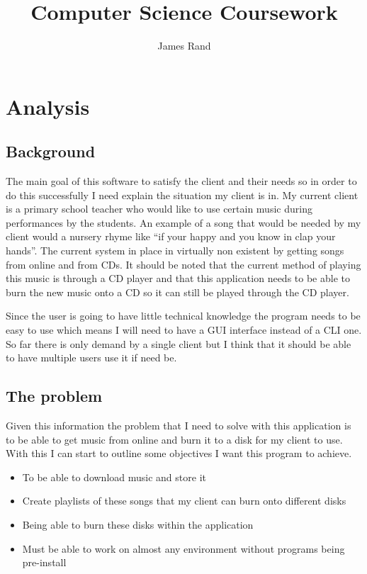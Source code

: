 \documentclass{article}
\title{Computer Science Coursework}
\date{}
\author{James Rand}
\def\tightlist{}
\begin{document}
\maketitle

\tableofcontents
\setcounter{tocdepth}{5}

\newpage

\section{Analysis}\label{analysis}

\subsection{Background}\label{background}

The main goal of this software to satisfy the client and their needs so
in order to do this successfully I need explain the situation my client
is in. My current client is a primary school teacher who would like to
use certain music during performances by the students. An example of a
song that would be needed by my client would a nursery rhyme like ``if
your happy and you know in clap your hands''. The current system in
place in virtually non existent by getting songs from online
and from CDs. It should be noted that the current method of playing this music
is through a CD player and that this application needs to be able to
burn the new music onto a CD so it can still be played through the CD
player.

Since the user is going to have little technical knowledge the program
needs to be easy to use which means I will need to have a GUI interface
instead of a CLI one. So far there is only demand by a single client but
I think that it should be able to have multiple users use it if need be.


\subsection{The problem}\label{the-problem}

Given this information the problem that I need to solve with this
application is to be able to get music from online and burn it to a disk
for my client to use. With this I can start to outline some objectives I
want this program to achieve.

\begin{itemize}
        \tightlist
    \item
        To be able to download music and store it
    \item
        Create playlists of these songs that my client can burn onto different
        disks
    \item
        Being able to burn these disks within the application
    \item
        Must be able to work on almost any environment without programs being
        pre-install 
\end{itemize}
\end{document}
